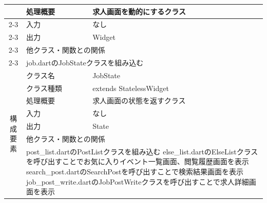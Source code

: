 \begin{table}[H]
\begin{tabular}{|c|l|l|}
                          & 処理概要                                                 & \multicolumn{1}{p{12cm}|}{求人画面を動的にするクラス}       \\ \cline{2-3}
                          & 入力                                                   & なし                                             \\ \cline{2-3}
                          & 出力                                                   & Widget                                         \\ \cline{2-3}
                          & \multicolumn{2}{l|}{他クラス・関数との関係}                                                                      \\ \cline{2-3}
                          & \multicolumn{2}{p{14cm}|}{job.dartのJobStateクラスを組み込む}                                                  \\ \hline
    \multirow{7}{*}{構成要素} & クラス名                                                 & JobState                                       \\ \cline{2-3}
                          & クラス種類                                                & extends StatelessWidget                        \\ \cline{2-3}
                          & 処理概要                                                 & \multicolumn{1}{p{12cm}|}{求人画面の状態を返すクラス}       \\ \cline{2-3}
                          & 入力                                                   & なし                                             \\ \cline{2-3}
                          & 出力                                                   & State                                          \\ \cline{2-3}
                          & \multicolumn{2}{l|}{他クラス・関数との関係}                                                                      \\ \cline{2-3}
                          & \multicolumn{2}{p{14cm}|}{
      post\_list.dartのPostListクラスを組み込む
      \newline else\_list.dartのElseListクラスを呼び出すことでお気に入りイベント一覧画面、閲覧履歴画面を表示
      \newline search\_post.dartのSearchPostを呼び出すことで検索結果画面を表示
    \newline job\_post\_write.dartのJobPostWriteクラスを呼び出すことで求人詳細画面を表示}                                                              \\ \hline
  \end{tabular}
\end{table}

